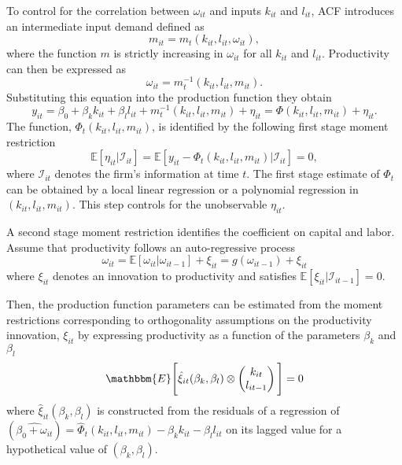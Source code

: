 \documentclass[11pt]{article}
\begin{document}
To control for the correlation between $\omega_{it}$ and inputs $k_{it}$ and $l_{it}$, ACF introduces an intermediate input demand defined as
\begin{equation}
m_{it}=m_{t}(k_{it}, l_{it}, \omega_{it}),
\end{equation}
where the function $m$ is strictly increasing in $\omega_{it}$ for all $k_{it}$ and $l_{it}$. Productivity can then be expressed as
\begin{equation}
\omega_{it}=m_{t}^{-1}(k_{it}, l_{it}, m_{it}).
\end{equation}
Substituting this equation into the production function they obtain
\begin{equation}
y_{it}=\beta_{0}+\beta_{k}k_{it}+\beta_{l}l_{it}+m^{-1}_{t}(k_{it}, l_{it}, m_{it})+\eta_{it}=\Phi(k_{it}, l_{it}, m_{it})+\eta_{it}.
\end{equation}
The function, $\Phi_{t}(k_{it}, l_{it}, m_{it})$, is identified by the following first stage moment restriction
\begin{equation}
\mathbb{E}[\eta_{it}|\mathcal{I}_{it}]=\mathbb{E}[y_{it}-\Phi_{t}(k_{it}, l_{it}, m_{it})|\mathcal{I}_{it}]=0,
\end{equation}
where $\mathcal{I}_{it}$ denotes the firm's information at time $t$. The first stage estimate of $\Phi_{t}$ can be obtained by a local linear regression or a polynomial regression in $(k_{it}, l_{it}, m_{it})$. This step controls for the unobservable $\eta_{it}$.

A second stage moment restriction identifies the coefficient on capital and labor. Assume that productivity follows an auto-regressive process
\begin{equation}
\omega_{it}=\mathbb{E}[\omega_{it}|\omega_{it-1}]+\xi_{it}=g(\omega_{it-1})+\xi_{it}
\end{equation}
where $\xi_{it}$ denotes an innovation to productivity and satisfies $\mathbb{E}[\xi_{it}|\mathcal{I}_{it-1}]=0$.

Then, the production function parameters can be estimated from the moment restrictions corresponding to orthogonality assumptions on the productivity innovation, $\xi_{it}$ by expressing productivity as a function of the parameters $\beta_{k}$ and $\beta_{l}$
\begin{equation}
\mathbbm{E}\Bigg[\hat{\xi}_{it}(\beta_{k}, \beta_{l})\otimes
\begin{pmatrix}
k_{it}\\
l_{it-1}
\end{pmatrix}\Bigg]=0
\end{equation}
where $\hat{\xi}_{it}(\beta_{k}, \beta_{l})$ is constructed from the residuals of a regression of $(\widehat{\beta_{0}+\omega_{it}})=\hat{\Phi}_{t}(k_{it}, l_{it}, m_{it})-\beta_{k}k_{it}-\beta_{l}l_{it}$ on its lagged value for a hypothetical value of $(\beta_{k}, \beta_{l})$.  
\end{document}
